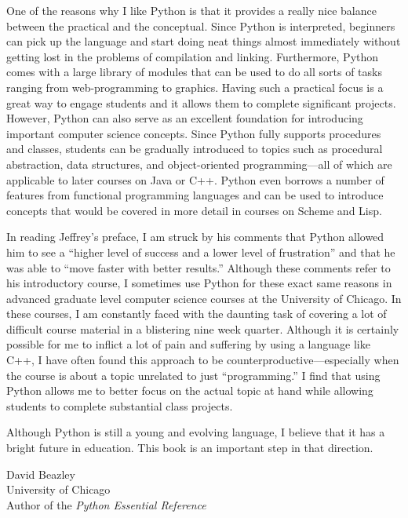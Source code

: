 One of the reasons why I like Python is that it provides a really nice
balance between the practical and the conceptual.  Since Python is
interpreted, beginners can pick up the language and start doing
neat things almost immediately without getting lost in the problems of
compilation and linking.  Furthermore, Python comes with a large
library of modules that can be used to do all sorts of tasks ranging
from web-programming to graphics.  Having such a practical focus is a
great way to engage students and it allows them to complete
significant projects.  However, Python can also serve as an excellent
foundation for introducing important computer science concepts.  Since
Python fully supports procedures and classes, students can be
gradually introduced to topics such as procedural abstraction, data
structures, and object-oriented programming---all of which are
applicable to later courses on Java or C++.  Python even borrows a
number of features from functional programming languages and can be
used to introduce concepts that would be covered in more detail in
courses on Scheme and Lisp.

In reading Jeffrey's preface, I am struck by his comments that Python
allowed him to see a ``higher level of success and a lower level of
frustration'' and that he was able to ``move faster with better
results.''  Although these comments refer to his introductory course, I
sometimes use Python for these exact same reasons in advanced graduate
level computer science courses at the University of Chicago.  In these
courses, I am constantly faced with the daunting task of covering a
lot of difficult course material in a blistering nine week quarter.
Although it is certainly possible for me to inflict a lot of pain and
suffering by using a language like C++, I have often found this
approach to be counterproductive---especially when the course is about
a topic unrelated to just ``programming.''  I find that using Python
allows me to better focus on the actual topic at hand while allowing
students to complete substantial class projects.

Although Python is still a young and evolving language, I believe that
it has a bright future in education.  This book is an important step in
that direction.

\vspace{0.25in}
\begin{flushleft}
David Beazley \\
University of Chicago \\
Author of the {\em Python Essential Reference} \\
\end{flushleft}

   



